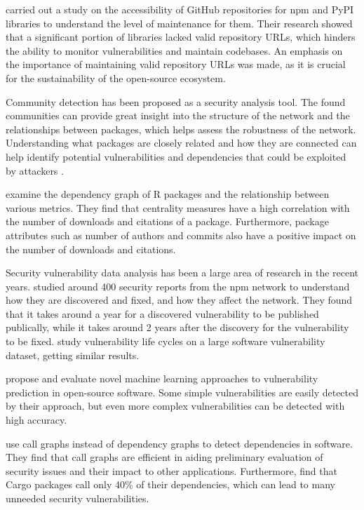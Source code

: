 \documentclass[9pt,twocolumn,twoside]{pnas-report}
\begin{document}
\cite{tsakpinis2024accessibility} carried out a study on the accessibility of GitHub repositories for npm and PyPI libraries to understand the level of maintenance for them.
Their research showed that a significant portion of libraries lacked valid repository URLs, which hinders the ability to monitor vulnerabilities and maintain codebases.
An emphasis on the importance of maintaining valid repository URLs was made, as it is crucial for the sustainability of the open-source ecosystem.

Community detection has been proposed as a security analysis tool.
The found communities can provide great insight into the structure of the network and the relationships between packages, which helps assess the robustness of the network.
Understanding what packages are closely related and how they are connected can help identify potential vulnerabilities and dependencies that could be exploited by attackers \cite{hafner2021robustness, tsakpinis2024accessibility}.

\cite{korkmazrpackages} examine the dependency graph of R packages and the relationship between various metrics.
They find that centrality measures have a high correlation with the number of downloads and citations of a package.
Furthermore, package attributes such as number of authors and commits also have a positive impact on the number of downloads and citations.

Security vulnerability data analysis has been a large area of research in the recent years.
\cite{decan2018vulnerabilities} studied around 400 security reports from the npm network to understand how they are discovered and fixed, and how they affect the network.
They found that it takes around a year for a discovered vulnerability to be published publically, while it takes around 2 years after the discovery for the vulnerability to be fixed.
\cite{shahzad2012} study vulnerability life cycles on a large software vulnerability dataset, getting similar results.

\cite{HANIF2021103009} propose and evaluate novel machine learning approaches to vulnerability prediction in open-source software.
Some simple vulnerabilities are easily detected by their approach, but even more complex vulnerabilities can be detected with high accuracy.

\cite{hejderup2018} use call graphs instead of dependency graphs to detect dependencies in software.
They find that call graphs are efficient in aiding preliminary evaluation of security issues and their impact to other applications.
Furthermore, \cite{hejderup2022prazi} find that Cargo packages call only 40\% of their dependencies, which can lead to many unneeded security vulnerabilities.
\end{document}
